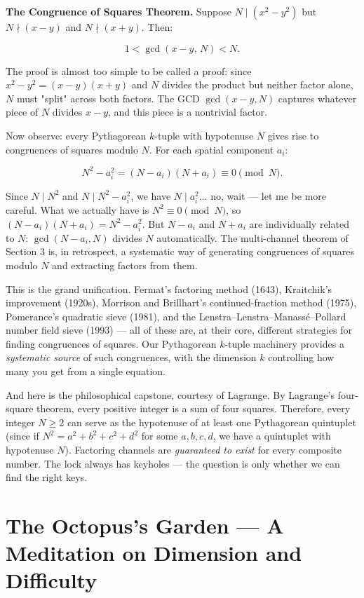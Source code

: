 \documentclass[11pt,twoside,openright]{book}
\theoremstyle{definition}
\theoremstyle{remark}
\begin{document}
\textbf{The Congruence of Squares Theorem.} Suppose $N \mid (x^2 - y^2)$ but $N \nmid (x - y)$ and $N \nmid (x + y)$. Then:

\[1 < \gcd(x - y, \, N) < N.\]

The proof is almost too simple to be called a proof: since $x^2 - y^2 = (x - y)(x + y)$ and $N$ divides the product but neither factor alone, $N$ must "split" across both factors. The GCD $\gcd(x - y, N)$ captures whatever piece of $N$ divides $x - y$, and this piece is a nontrivial factor.

Now observe: every Pythagorean $k$-tuple with hypotenuse $N$ gives rise to congruences of squares modulo $N$. For each spatial component $a_i$:

\[N^2 - a_i^2 = (N - a_i)(N + a_i) \equiv 0 \pmod{N}.\]

Since $N \mid N^2$ and $N \mid N^2 - a_i^2$, we have $N \mid a_i^2$... no, wait --- let me be more careful. What we actually have is $N^2 \equiv 0 \pmod{N}$, so $(N - a_i)(N + a_i) = N^2 - a_i^2$. But $N - a_i$ and $N + a_i$ are individually related to $N$: $\gcd(N - a_i, N)$ divides $N$ automatically. The multi-channel theorem of Section 3 is, in retrospect, a systematic way of generating congruences of squares modulo $N$ and extracting factors from them.

This is the grand unification. Fermat's factoring method (1643), Kraitchik's improvement (1920s), Morrison and Brillhart's continued-fraction method (1975), Pomerance's quadratic sieve (1981), and the Lenstra--Lenstra--Manass\'e--Pollard number field sieve (1993) --- all of these are, at their core, different strategies for finding congruences of squares. Our Pythagorean $k$-tuple machinery provides a \textit{systematic source} of such congruences, with the dimension $k$ controlling how many you get from a single equation.

And here is the philosophical capstone, courtesy of Lagrange. By Lagrange's four-square theorem, every positive integer is a sum of four squares. Therefore, every integer $N \geq 2$ can serve as the hypotenuse of at least one Pythagorean quintuplet (since if $N^2 = a^2 + b^2 + c^2 + d^2$ for some $a, b, c, d$, we have a quintuplet with hypotenuse $N$). Factoring channels are \textit{guaranteed to exist} for every composite number. The lock always has keyholes --- the question is only whether we can find the right keys.




\section{The Octopus's Garden --- A Meditation on Dimension and Difficulty}
\end{document}
